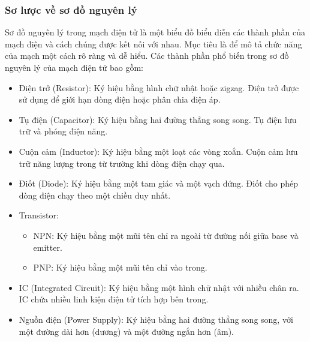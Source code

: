 \subsubsection{Sơ lược về sơ đồ nguyên lý}
    Sơ đồ nguyên lý trong mạch điện tử là một biểu đồ biểu diễn các thành phần của
mạch điện và cách chúng được kết nối với nhau. Mục tiêu là để mô tả chức năng của
mạch một cách rõ ràng và dễ hiểu. Các thành phần phổ biến trong sơ đồ nguyên lý của
mạch điện tử bao gồm:
\begin{itemize}
    \item Điện trở (Resistor): Ký hiệu bằng hình chữ nhật hoặc zigzag. Điện trở được sử dụng để giới hạn dòng điện hoặc phân chia điện áp.
    \item Tụ điện (Capacitor): Ký hiệu bằng hai đường thẳng song song. Tụ điện lưu trữ và phóng điện năng.
    \item Cuộn cảm (Inductor): Ký hiệu bằng một loạt các vòng xoắn. Cuộn cảm lưu trữ năng lượng trong từ trường khi dòng điện chạy qua.
    \item Điốt (Diode): Ký hiệu bằng một tam giác và một vạch đứng. Điốt cho phép dòng điện chạy theo một chiều duy nhất.
    \item Transistor:
    \begin{itemize}
        \item NPN: Ký hiệu bằng một mũi tên chỉ ra ngoài từ đường nối giữa base và emitter.
        \item PNP: Ký hiệu bằng một mũi tên chỉ vào trong.
    \end{itemize}
    \item IC (Integrated Circuit): Ký hiệu bằng một hình chữ nhật với nhiều chân ra. IC chứa nhiều linh kiện điện tử tích hợp bên trong.
    \item Nguồn điện (Power Supply): Ký hiệu bằng hai đường thẳng song song, với một đường dài hơn (dương) và một đường ngắn hơn (âm).
\end{itemize}
